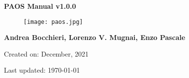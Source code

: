 

\begin{titlepage}

    \centering

    \vspace*{30mm} %
    \textbf{\Huge {PAOS Manual v1.0.0}}

    \vspace{20mm}
    \begin{figure}[!h]
        \centering
        \texttt{[image: paos.jpg]}
        \label{fig:paos_logo}
    \end{figure}

    \vspace{25mm}
    \Large \textbf{{Andrea Bocchieri, Lorenzo V. Mugnai, Enzo Pascale}}

    \vspace*{8mm}
    \small Created on: December, 2021

    \vspace{2mm}
    \small Last updated: \MonthYearFormat\today


\end{titlepage}

\clearpage
{}
\tableofcontents
\listoffigures
\listoftables
\clearpage
{}
